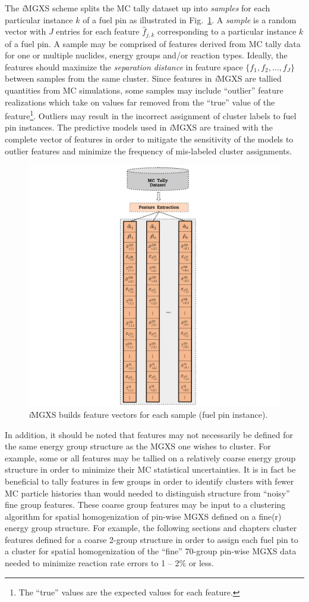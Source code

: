 The \textit{i}\ac{MGXS} scheme splits the \ac{MC} tally dataset up into \textit{samples} for each particular instance $k$ of a fuel pin as illustrated in Fig.~\ref{fig:chap10-feature-eng}. A \textit{sample} is a random vector with $J$ entries for each feature $\hat{f}_{j,k}$ corresponding to a particular instance $k$ of a fuel pin. A sample may be comprised of features derived from \ac{MC} tally data for one or multiple nuclides, energy groups and/or reaction types. Ideally, the features should maximize the \textit{separation distance} in feature space $\{f_{1}, f_{2}, \dots, f_{J}\}$ between samples from the same cluster. Since features in \textit{i}\ac{MGXS} are tallied quantities from \ac{MC} simulations, some samples may include ``outlier'' feature realizations which take on values far removed from the ``true'' value of the feature\footnote{The ``true'' values are the expected values for each feature.}. Outliers may result in the incorrect assignment of cluster labels to fuel pin instances. The predictive models used in \textit{i}\ac{MGXS} are trained with the complete vector of features in order to mitigate the sensitivity of the models to outlier features and minimize the frequency of mis-labeled cluster assignments.

\begin{figure}[h!]
\centering
\includegraphics[width=0.4\linewidth]{figures/unsupervised/features/engineering/features}
\vspace{2mm}
\caption[\textit{i}MGXS sample feature vector construction]{\textit{i}\ac{MGXS} builds feature vectors for each sample (fuel pin instance).}
\label{fig:chap10-feature-eng}
\end{figure}

In addition, it should be noted that features may not necessarily be defined for the same energy group structure as the \ac{MGXS} one wishes to cluster. For example, some or all features may be tallied on a relatively coarse energy group structure in order to minimize their \ac{MC} statistical uncertainties. It is in fact be beneficial to tally features in few groups in order to identify clusters with fewer \ac{MC} particle histories than would needed to distinguish structure from ``noisy'' fine group features.
These coarse group features may be input to a clustering algorithm for spatial homogenization of pin-wise \ac{MGXS} defined on a fine(r) energy group structure. For example, the following sections and chapters cluster features defined for a coarse 2-group structure in order to assign each fuel pin to a cluster for spatial homogenization of the ``fine'' 70-group pin-wise \ac{MGXS} data needed to minimize reaction rate errors to 1 -- 2\% or less.

